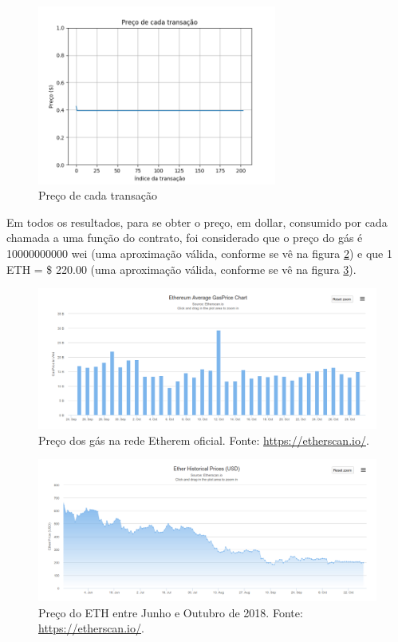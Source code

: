 \begin{figure}[h!]
\centering
\includegraphics[width=0.7\textwidth]{Cap3/scife_gps_sim_price.png}
\caption{Preço de cada transação}
\label{scife_gps_sim_price}
\end{figure}

Em todos os resultados, para se obter o preço, em dollar, consumido por cada chamada a uma função do contrato, foi considerado que o preço do gás é 10000000000 wei (uma aproximação válida, conforme se vê na figura \ref{gas_price_chart}) e que 1 ETH = \$ 220.00 (uma aproximação válida, conforme se vê na figura \ref{eth_price_chart}).

\begin{figure}[h!]
\centering
\includegraphics[width=1\textwidth]{Cap3/gas_price_chart}
\caption{Preço dos gás na rede Etherem oficial. Fonte: \href{https://etherscan.io/}{https://etherscan.io/}.}
\label{gas_price_chart}
\end{figure}

\begin{figure}[h!]
\centering
\includegraphics[width=1\textwidth]{Cap3/eth_price_chart}
\caption{Preço do ETH entre Junho e Outubro de 2018. Fonte: \href{https://etherscan.io/}{https://etherscan.io/}.}
\label{eth_price_chart}
\end{figure}

